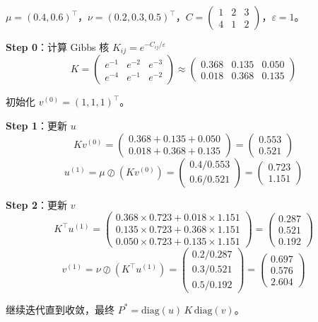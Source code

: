 \documentclass[12pt, a4paper]{ctexart}
\begin{document}
\begin{blackboard}[手算例子]

$\mu = (0.4, 0.6)^\top$，$\nu = (0.2, 0.3, 0.5)^\top$，$C = \begin{pmatrix} 1 & 2 & 3 \\ 4 & 1 & 2 \end{pmatrix}$，$\varepsilon = 1$。

\textbf{Step 0}：计算 Gibbs 核 $K_{ij} = e^{-C_{ij}/\varepsilon}$
\[
K = \begin{pmatrix} e^{-1} & e^{-2} & e^{-3} \\ e^{-4} & e^{-1} & e^{-2} \end{pmatrix} \approx \begin{pmatrix} 0.368 & 0.135 & 0.050 \\ 0.018 & 0.368 & 0.135 \end{pmatrix}
\]

初始化 $v^{(0)} = (1, 1, 1)^\top$。

\textbf{Step 1}：更新 $u$
\[
Kv^{(0)} = \begin{pmatrix} 0.368 + 0.135 + 0.050 \\ 0.018 + 0.368 + 0.135 \end{pmatrix} = \begin{pmatrix} 0.553 \\ 0.521 \end{pmatrix}
\]
\[
u^{(1)} = \mu \oslash (Kv^{(0)}) = \begin{pmatrix} 0.4/0.553 \\ 0.6/0.521 \end{pmatrix} = \begin{pmatrix} 0.723 \\ 1.151 \end{pmatrix}
\]

\textbf{Step 2}：更新 $v$
\[
K^\top u^{(1)} = \begin{pmatrix} 0.368 \times 0.723 + 0.018 \times 1.151 \\ 0.135 \times 0.723 + 0.368 \times 1.151 \\ 0.050 \times 0.723 + 0.135 \times 1.151 \end{pmatrix} = \begin{pmatrix} 0.287 \\ 0.521 \\ 0.192 \end{pmatrix}
\]
\[
v^{(1)} = \nu \oslash (K^\top u^{(1)}) = \begin{pmatrix} 0.2/0.287 \\ 0.3/0.521 \\ 0.5/0.192 \end{pmatrix} = \begin{pmatrix} 0.697 \\ 0.576 \\ 2.604 \end{pmatrix}
\]

继续迭代直到收敛，最终 $P^* = \text{diag}(u) \, K \, \text{diag}(v)$。

\end{blackboard}
\end{document}
